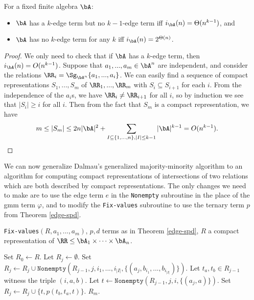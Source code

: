 \begin{cor} For a fixed finite algebra $\bA$:
\begin{itemize}
\item $\bA$ has a $k$-edge term but no $k-1$-edge term iff $i_\bA(n) = \Theta(n^{k-1})$, and

\item $\bA$ has no $k$-edge term for any $k$ iff $i_\bA(n) = 2^{\Theta(n)}$.
\end{itemize}
\end{cor}
\begin{proof} We only need to check that if $\bA$ has a $k$-edge term, then $i_\bA(n) = O(n^{k-1})$. Suppose that $a_1, ..., a_m \in \bA^n$ are independent, and consider the relations $\RR_i = \Sg_{\bA^n}\{a_1, ..., a_i\}$. We can easily find a sequence of compact representations $S_1, ..., S_m$ of $\RR_1, ..., \RR_m$ with $S_i \subseteq S_{i+1}$ for each $i$. From the independence of the $a_i$s, we have $\RR_i \ne \RR_{i+1}$ for all $i$, so by induction we see that $|S_i| \ge i$ for all $i$. Then from the fact that $S_m$ is a compact representation, we have
\[
m \le |S_m| \le 2n|\bA|^2 + \sum_{I \subseteq \{1, ..., n\}, |I| \le k-1} |\bA|^{k-1} = O(n^{k-1}).\qedhere
\]
\end{proof}

We can now generalize Dalmau's generalized majority-minority algorithm to an algorithm for computing compact representations of intersections of two relations which are both described by compact representations. The only changes we need to make are to use the edge term $e$ in the \texttt{Nonempty} subroutine in the place of the gmm term $\varphi$, and to modify the \texttt{Fix-values} subroutine to use the ternary term $p$ from Theorem \ref{edge-spd}.

\begin{algorithm}
\caption{\texttt{Fix-values}$(R, a_1, ..., a_m)$, $p,d$ terms as in Theorem \ref{edge-spd}, $R$ a compact representation of $\RR \le \bA_1\times \cdots\times \bA_n$.}
\begin{algorithmic}[1]
\State Set $R_0 \gets R$.
\State Let $R_j \gets \emptyset$.
\State Set $R_j \gets R_j \cup \texttt{Nonempty}(R_{j-1},j,i_1,...,i_{|I|},\{(a_j,b_{i_1},...,b_{i_{|I|}})\})$.
\EndFor
{}%
\State Let $t_a,t_b \in R_{j-1}$ witness the triple $(i,a,b)$.%
\State Let $t \gets \texttt{Nonempty}(R_{j-1},j,i,\{(a_{j},a)\})$.
\State Set $R_{j} \gets R_{j} \cup \{t, p(t_b,t_a,t)\}$.
\EndIf
\EndFor
\EndFor
\State \Return $R_m$.
\end{algorithmic}
\end{algorithm}


